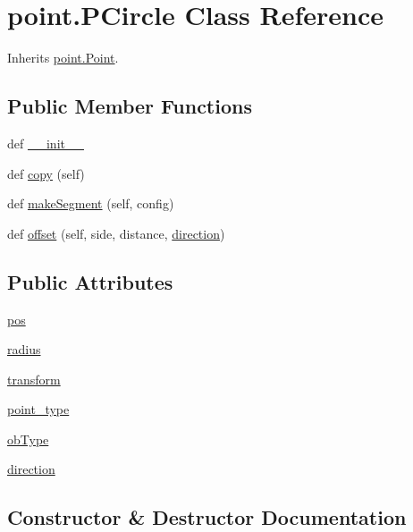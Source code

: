 \hypertarget{classpoint_1_1_p_circle}{}\section{point.\+P\+Circle Class Reference}
\label{classpoint_1_1_p_circle}


Inherits \hyperlink{classpoint_1_1_point}{point.\+Point}.

\subsection*{Public Member Functions}
\begin{DoxyCompactItemize}
\item 
def \hyperlink{classpoint_1_1_p_circle_a849979339b44346f6d30eb4d7116a529}{\+\_\+\+\_\+init\+\_\+\+\_\+}
\item 
def \hyperlink{classpoint_1_1_p_circle_a590ec8df59749fbeb48eef342699301f}{copy} (self)
\item 
def \hyperlink{classpoint_1_1_p_circle_a964f3e531f3bc96e02cc7c4ef4725e97}{make\+Segment} (self, config)
\item 
def \hyperlink{classpoint_1_1_p_circle_a7aea6d37bce51f0fe31165d5680106dc}{offset} (self, side, distance, \hyperlink{classpoint_1_1_p_circle_a2f347dfa1df7d18042d2891d4bc98118}{direction})
\end{DoxyCompactItemize}
\subsection*{Public Attributes}
\begin{DoxyCompactItemize}
\item 
\hyperlink{classpoint_1_1_p_circle_afd3ca22d6db40a41ad58972ad9e51aae}{pos}
\item 
\hyperlink{classpoint_1_1_p_circle_ae3538c963da5a83e8b24d7fb064ffa5a}{radius}
\item 
\hyperlink{classpoint_1_1_p_circle_a5659534b267f87d91e369f741830fdf5}{transform}
\item 
\hyperlink{classpoint_1_1_p_circle_a2f06a0a2f070da738547ad6bbb2355be}{point\+\_\+type}
\item 
\hyperlink{classpoint_1_1_p_circle_a5b8998606102289e3d4fc165256fe127}{ob\+Type}
\item 
\hyperlink{classpoint_1_1_p_circle_a2f347dfa1df7d18042d2891d4bc98118}{direction}
\end{DoxyCompactItemize}


\subsection{Constructor \& Destructor Documentation}
\hypertarget{classpoint_1_1_p_circle_a849979339b44346f6d30eb4d7116a529}{}
